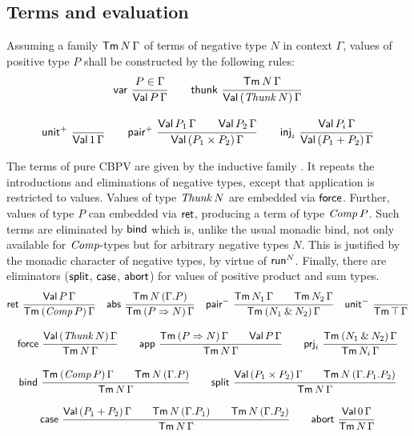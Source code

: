 \documentclass[sigplan,screen]{acmart}
\begin{document}
\subsection{Terms and evaluation}

Assuming a family $\mathsf{Tm}^{\,}N\,\Gamma$ of terms of negative type $N$ in
context $\Gamma$, values 
of positive type $P$ shall be constructed by the
following rules:
\begin{gather*}
  \nru{\tvar}{P \in \Gamma}{\PValT P \Gamma}
\qquad
  \nru{\tthunk}{\Tm N \Gamma}{\PValTP{\Thunk N}\Gamma}
\\[2ex]
  \nru{\punit}{}{\PValT{\tyone}\Gamma}
\qquad
  \nru{\ppair}
      {\PValT{P_1}\Gamma \qquad \PValT{P_2}\Gamma}
      {\PValTP{P_1 \times P_2}\Gamma}
\qquad
  \nru{\tinj_i}{\PValT{P_i}\Gamma}{\PValTP{P_1 + P_2}\Gamma}
\end{gather*}

The terms of pure CBPV are given by the inductive family .
It repeats the introductions and eliminations of negative types,
except that application is restricted to values.  Values of type
$\mathit{Thunk}\,N$ are embedded via $\mathsf{force}$.
Further, values of type $P$ can embedded
via $\mathsf{ret}$, producing a term of type $\mathit{Comp}\,P$.  Such terms are
eliminated by $\mathsf{bind}$ which is, unlike the usual monadic bind, not
only available for $\mathit{Comp}$-types but for arbitrary negative types
$N$.  This is justified by the monadic character of negative
types, by virtue of $\mathsf{run}^N$.  Finally, there are eliminators
($\mathsf{split}$, $\mathsf{case}$, $\mathsf{abort}$) for values of positive product and
sum types.
\begin{gather*}
  \nru{\tret}
      {\PValTm P \Gamma}
      {\TmP {\Comp P} \Gamma}
\quad
  \nru{\tabs}
      {\Tm N {(\cext \Gamma P)}}
      {\TmP {P \To N} \Gamma}
\quad
  \nru{\npair}
      {\Tm {N_1} \Gamma \qquad \Tm {N_2} \Gamma}
      {\TmP {N_1 \ntimes N_2} \Gamma}
\quad
  \nru{\nunit}
      {}
      {\Tm \top \Gamma}
\\[2ex]
  \nru{\tforce}
      {\PValTmP {\Thunk N} \Gamma}
      {\Tm N \Gamma}
\qquad
  \nru{\tapp}
      {\TmP {P \To N} \Gamma \qquad \PValTm P \Gamma}
      {\Tm N \Gamma}
\qquad
  \nru{\tprj_i}
      {\TmP {N_1 \ntimes N_2} \Gamma}
      {\Tm {N_i} \Gamma}
\\[2ex]
  \nru{\tbind}
      {\TmP {\Comp P} \Gamma \qquad \Tm N {(\cext \Gamma P)}}
      {\Tm N \Gamma}
\qquad
  \nru{\tsplit}
    {\PValTmP {P_1 \times P_2} \Gamma
      \qquad \Tm N {(\cext {\cext \Gamma P_1} P_2)}
    }{\Tm N \Gamma}
\\[2ex]
  \nru{\tcase}
    {\PValTmP {P_1 + P_2} \Gamma
      \qquad \Tm N {(\cext \Gamma P_1)}
      \qquad \Tm N {(\cext \Gamma P_2)}
    }{\Tm N \Gamma}
\qquad
  \nru{\tabort}
    {\PValTm \tyzero \Gamma}
    {\Tm N \Gamma}
\end{gather*}
\end{document}
